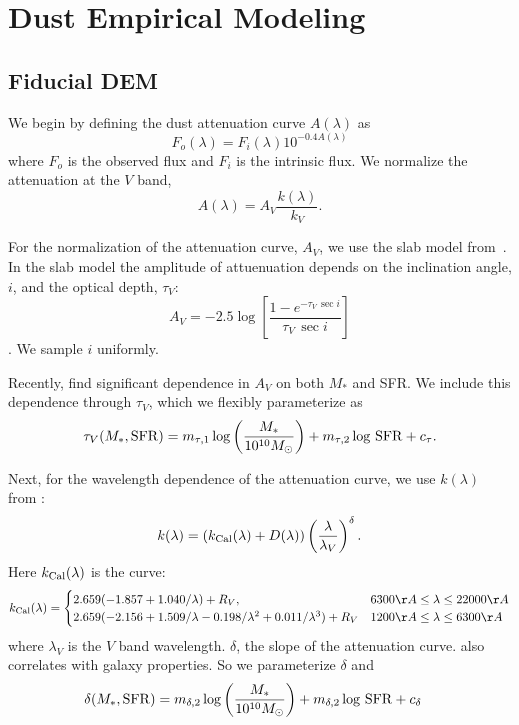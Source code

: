 \section{Dust Empirical Modeling} \label{sec:methods}
\subsection{Fiducial DEM} \label{sec:dem}

We begin by defining the dust attenuation curve $A(\lambda)$ as 
\begin{equation} 
    F_o (\lambda) = F_i (\lambda) 10^{-0.4 A(\lambda)}
\end{equation}
where $F_o$ is the observed flux and $F_i$ is the intrinsic flux. We normalize the attenuation at the $V$ band, 
\begin{equation} 
    A(\lambda) = A_V \frac{k(\lambda)}{k_V}. 
\end{equation}

For the normalization of the attenuation curve, $A_V$, we use the slab model
from~\cite{somerville1999, somerville2012}. In the slab model the amplitude of
attuenuation depends on the inclination angle, $i$, and the optical depth,
$\tau_V$: 
\begin{equation} \label{eq:slab}
    A_V = -2.5 \log \left[ \frac{1 - e^{-\tau_V\,\sec i}}{\tau_V\,\sec i} \right]
\end{equation}
. We sample $i$ uniformly.

Recently, \cite{salim2020} find significant dependence in $A_V$ on both $M_*$
and SFR. We include this dependence through $\tau_V$, which we flexibly
parameterize as 
\begin{equation} \label{eq:tauv}
    \tau_V(M_*, {\rm SFR}) = m_{\tau,1} \log \left(\frac{M_*}{10^{10} M_\odot}\right) +
    m_{\tau,2} \log\,{\rm SFR} + c_\tau.
\end{equation}

Next, for the wavelength dependence of the attenuation curve, we use $k(\lambda)$ from 
\cite{noll2009}: 
\begin{equation}
    k(\lambda) = \left(k_{\rm Cal}(\lambda) + D(\lambda)\right) \left(
    \frac{\lambda}{\lambda_V} \right)^\delta.
\end{equation}
Here $k_{\rm Cal}(\lambda)$ is the \cite{calzetti2001} curve: 
\[
    k_{\rm Cal}(\lambda) = 
    \begin{cases} 
        2.659 (-1.857 + 1.040/\lambda) + R_V, & 6300 \AA \le \lambda \le
        22000 \AA \\ 
        2.659 (-2.156 + 1.509/\lambda - 0.198/\lambda^2 + 0.011/\lambda^3) +
        R_V & 1200 \AA \le \lambda \le 6300 \AA
    \end{cases}
\]
where $\lambda_V$ is the $V$ band wavelength. $\delta$, the slope of the attenuation curve.
also correlates with galaxy
properties.
So we parameterize $\delta$ and 
\begin{align}
    \delta(M_*, {\rm SFR}) &= m_{\delta,2} \log \left(\frac{M_*}{10^{10}
    M_\odot}\right) + m_{\delta,2} \log\,{\rm SFR} + c_\delta 
\end{align}

